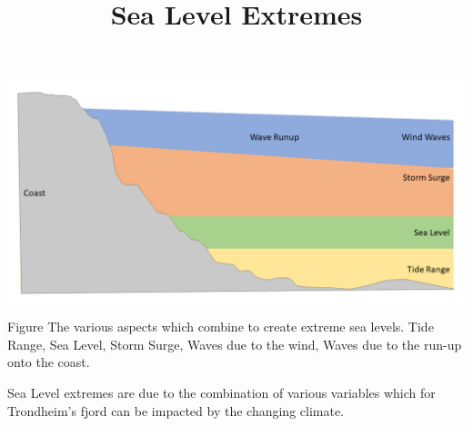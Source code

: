 \documentclass{article}
\begin{document}
\title{Sea Level Extremes}
\includegraphics[width=1\textwidth]{fig_theory/sea level extremes.png}

\begin{frame}{Figure The various aspects which combine to create extreme sea levels. Tide Range, Sea Level, Storm Surge, Waves due to the wind, Waves due to the run-up onto the coast.}

Sea Level extremes are due to the combination of various variables which for Trondheim's fjord can be impacted by the changing climate. 

\end{frame}
\end{document}

